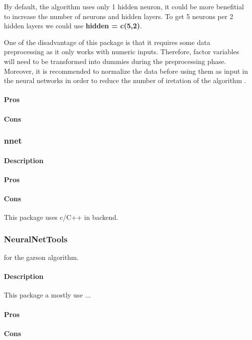 \documentclass[6pt,letter]{article}\usepackage[]{graphicx}\usepackage[]{color}
\begin{document}
By default, the algorithm uses only 1 hidden neuron, it could be more benefitial to increase the number of neurons and hidden layers. To get 5 neurons per 2 hidden layers we could use \textbf{hidden = c(5,2)}.


One of the disadvantage of this package is that it requires some data preprocessing as it only works with numeric inputs. Therefore, factor variables will need to be transformed into dummies during the preprocessing phase. Moreover, it is recommended to normalize the data before using them as input in the neural networks in order to reduce the number of iretation of the algorithm \cite{neuralnet2019}.

\paragraph{Pros}
\paragraph{Cons}
\subsubsection{nnet}
\paragraph{Description}
\paragraph{Pros}
\paragraph{Cons}
This package uses c/C++ in backend.

\subsubsection{NeuralNetTools}
for the garson algorithm.
\paragraph{Description}
This package a mostly use ... \cite{NeuralNetTools2018}
\paragraph{Pros}
\paragraph{Cons}
\end{document}
